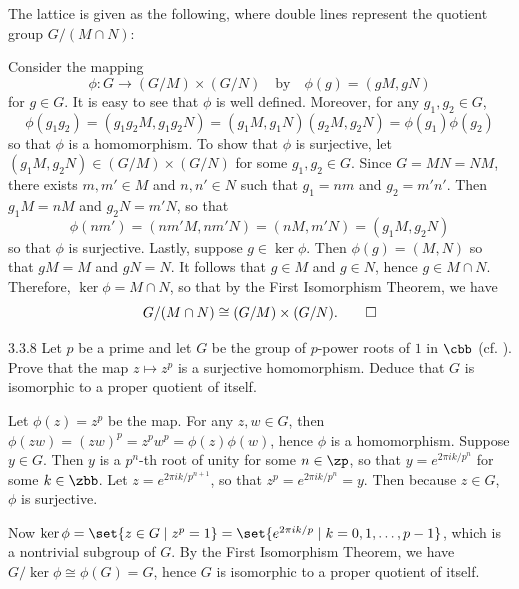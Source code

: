 \begin{sol}
    The lattice is given as the following, where double lines represent the quotient group $G/(M \cap N)$:
    \begin{center}
    \end{center}
    Consider the mapping
    \[
    	\phi \colon G \to (G/M) \times (G/N) \quad \text{by} \quad \phi(g) = (gM, gN)
    \]
    for $g \in G$.
	It is easy to see that $\phi$ is well defined.
	Moreover, for any $g_1, g_2 \in G$,
    \[
    	\phi(g_1g_2) = (g_1g_2M, g_1g_2N) = (g_1M, g_1N)(g_2M, g_2N) = \phi(g_1)\phi(g_2)
    \]
    so that $\phi$ is a homomorphism.
	To show that $\phi$ is surjective, let $(g_1M, g_2N) \in (G/M) \times (G/N)$ for some $g_1, g_2 \in G$.
	Since $G = MN = NM$, there exists $m, m' \in M$ and $n, n' \in N$ such that $g_1 = nm$ and $g_2 = m'n'$.
	Then $g_1M = nM$ and $g_2N = m'N$, so that
    \[
    	\phi(nm') = (nm'M, nm'N) = (nM, m'N) = (g_1M, g_2N)
    \]
    so that $\phi$ is surjective.
	Lastly, suppose $g \in \ker\phi$.
	Then $\phi(g) = (M, N)$ so that $gM = M$ and $gN = N$.
	It follows that $g \in M$ and $g \in N$, hence $g \in M \cap N$.
	Therefore, $\ker\phi = M \cap N$, so that by the First Isomorphism Theorem, we have
    \[
    	G/(M \cap N) \cong (G/M) \times (G/N). \qedhere
    \]
\end{sol}

\begin{exercise}{3.3.8}
    Let $p$ be a prime and let $G$ be the group of $p$-power roots of $1$ in $\cbb$ (cf. ).
	Prove that the map $z \mapsto z^p$ is a surjective homomorphism.
	Deduce that $G$ is isomorphic to a proper quotient of itself.
\end{exercise}

\begin{sol}
    Let $\phi(z) = z^p$ be the map.
	For any $z, w \in G$, then $\phi(zw) = (zw)^p = z^p w^p = \phi(z)\phi(w)$, hence $\phi$ is a homomorphism.
	Suppose $y \in G$.
    Then $y$ is a $p^n$-th root of unity for some $n \in \zp$, so that $y = e^{2\pi i k/p^n}$ for some $k \in \zbb$.
	Let $z = e^{2\pi i k/p^{n+1}}$, so that $z^p = e^{2\pi i k/p^n} = y$. Then because $z \in G$, $\phi$ is surjective.

    Now $\ker\phi = \set{z \in G \mid z^p = 1} = \set{e^{2\pi i k/p} \mid k = 0, 1, \ldots, p - 1}$, which is a nontrivial subgroup of $G$.
    By the First Isomorphism Theorem, we have $G/\ker\phi \cong \phi(G) = G$, hence $G$ is isomorphic to a proper quotient of itself.
\end{sol}

